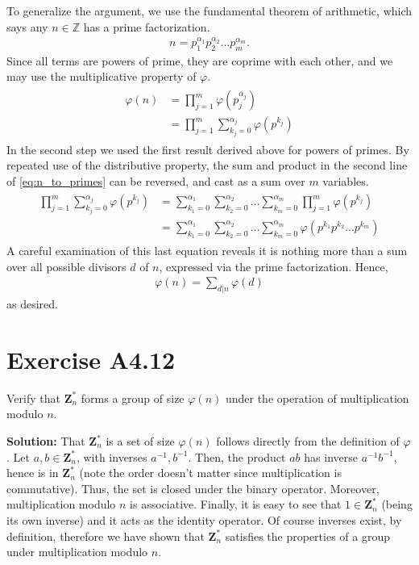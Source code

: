 \documentclass{book}
\begin{document}
    To generalize the argument, we use the fundamental theorem of arithmetic, which says any $n\in \mathbb{Z}$ has a prime factorization.
    \begin{align}
        n = p_1^{\alpha_1}p_2^{\alpha_2}...p_m^{\alpha_m}.
    \end{align}
    Since all terms are powers of prime, they are coprime with each other, and we may use the multiplicative property of $\varphi$.
    \begin{align} \label{eq:n_to_primes}
    \begin{aligned}
        \varphi(n) &= \prod_{j=1}^{m}\varphi(p_j^{\alpha_j}) \\
        &= \prod_{j=1}^m \sum_{k_j=0}^{\alpha_j}\varphi(p^{k_j})
    \end{aligned}
    \end{align}
    In the second step we used the first result derived above for powers of primes. By repeated use of the distributive property, the sum and product in the second line of \eqref{eq:n_to_primes} can be reversed, and cast as a sum over $m$ variables.
    \begin{align}
    \begin{aligned}
        \prod_{j=1}^m \sum_{k_j=0}^{\alpha_j}\varphi(p^{k_j}) &= \sum_{k_1=0}^{\alpha_1}\sum_{k_2=0}^{\alpha_2} \dots \sum_{k_m=0}^{\alpha_m} \prod_{j=1}^m \varphi(p^{k_j}) \\
        &= \sum_{k_1=0}^{\alpha_1}\sum_{k_2=0}^{\alpha_2} \dots \sum_{k_m=0}^{\alpha_m} \varphi(p^{k_1}p^{k_2}...p^{k_m})
    \end{aligned}
    \end{align}
    A careful examination of this last equation reveals it is nothing more than a sum over all possible divisors $d$ of $n$, expressed via the prime factorization. Hence,
    \begin{align}
        \varphi(n) = \sum_{d|n} \varphi(d)
    \end{align}
    as desired.

\section*{Exercise A4.12}
    Verify that $\textbf{Z}_n^*$ forms a group of size $\varphi(n)$ under the operation of multiplication modulo $n$.
    
    \textbf{Solution:} That $\textbf{Z}_n^*$ is a set of size $\varphi(n)$ follows directly from the definition of $\varphi$. Let $a,b \in \textbf{Z}_n^*$, with inverses $a^{-1}, b^{-1}$. Then, the product $ab$ has inverse $a^{-1}b^{-1}$, hence is in $\textbf{Z}_n^*$ (note the order doesn't matter since multiplication is commutative). Thus, the set is closed under the binary operator. Moreover, multiplication modulo $n$ is associative. Finally, it is easy to see that $1\in \textbf{Z}_n^*$ (being its own inverse) and it acts as the identity operator. Of course inverses exist, by definition, therefore we have shown that $\textbf{Z}_n^*$ satisfies the properties of a group under multiplication modulo $n$.
\end{document}
